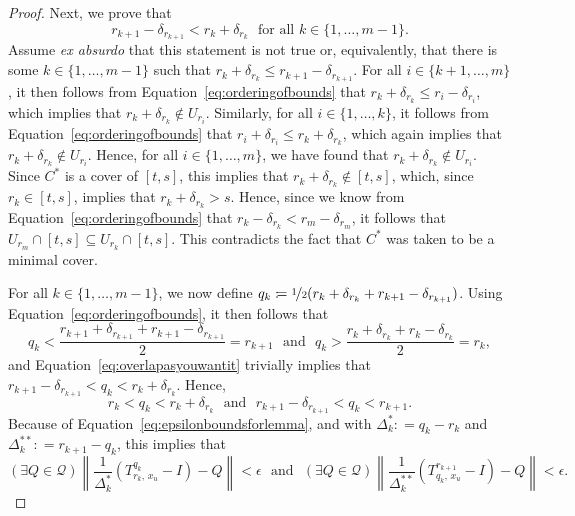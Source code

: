 \documentclass[10pt]{paper}
\theoremstyle{definition}
\newcommand{\rateset}{\mathcal{Q}}
\newcommand{\norm}[1]{\left\lVert #1 \right\rVert}
\newcommand{\coloneqq}{:\!=}
\begin{document}
\begin{proof}
Next, we prove that
\begin{equation}\label{eq:overlapasyouwantit}
r_{k+1}-\delta_{r_{k+1}}<r_k+\delta_{r_k}
\text{~~for all $k\in\{1,\dots,m-1\}$.}
\end{equation}
Assume \emph{ex absurdo} that this statement is not true or, equivalently, that there is some $k\in\{1,\dots,m-1\}$ such that $r_k+\delta_{r_k}\leq r_{k+1}-\delta_{r_{k+1}}$. For all $i\in\{k+1,\dots, m\}$, it then follows from Equation~\eqref{eq:orderingofbounds} that $r_k+\delta_{r_k}\leq r_i-\delta_{r_i}$, which implies that $r_k+\delta_{r_k}\notin U_{r_i}$. Similarly, for all $i\in\{1,\dots,k\}$, it follows from Equation~\eqref{eq:orderingofbounds} that $r_i+\delta_{r_i}\leq r_k+\delta_{r_k}$, which again implies that $r_k+\delta_{r_k}\notin U_{r_i}$. 
Hence, for all $i\in\{1,\dots,m\}$, we have found that $r_k+\delta_{r_k}\notin U_{r_i}$. 
Since $C^*$ is a cover of $[t,s]$, this implies that $r_k+\delta_{r_k}\notin[t,s]$, which, since $r_k\in[t,s]$, implies that $r_k+\delta_{r_k}>s$. Hence, since we know from Equation~\eqref{eq:orderingofbounds} that $r_k-\delta_{r_k}<r_m-\delta_{r_m}$, it follows that $U_{r_m}\cap[t,s]\subseteq U_{r_k}\cap[t,s]$. This contradicts the fact that $C^*$ was taken to be a minimal cover.

For all $k\in\{1,\dots,m-1\}$, we now define $q_k\coloneqq\nicefrac{1}{2}(r_k+\delta_{r_k}+r_{k+1}-\delta_{r_{k+1}})$.
Using Equation~\eqref{eq:orderingofbounds}, it then follows that
\begin{equation*}
q_k<\frac{r_{k+1}+\delta_{r_{k+1}}+r_{k+1}-\delta_{r_{k+1}}}{2}=r_{k+1}
\text{~~and~~}
q_k>\frac{r_{k}+\delta_{r_{k}}+r_{k}-\delta_{r_{k}}}{2}=r_{k},
\end{equation*}
and Equation~\eqref{eq:overlapasyouwantit} trivially implies that $r_{k+1}-\delta_{r_{k+1}}<q_k<r_k+\delta_{r_k}$. Hence,
\begin{equation*}
r_k<q_k<r_k+\delta_{r_k}
\text{~~and~~}
r_{k+1}-\delta_{r_{k+1}}<q_k<r_{k+1}.
\end{equation*}
Because of Equation~\eqref{eq:epsilonboundsforlemma}, and with $\Delta^*_k\coloneqq q_k-r_k$ and $\Delta^{**}_k\coloneqq r_{k+1}-q_k$, this implies that
\begin{equation}\label{eq:epsilonboundsforqk}
(\exists Q\in\rateset)
\norm{\frac{1}{\Delta^*_k}
(T^{q_k}_{r_k,\,x_u}-I)-Q}<\epsilon
\text{~~and~~}
(\exists Q\in\rateset)
\norm{\frac{1}{\Delta^{**}_k}
(T^{r_{k+1}}_{q_k,\,x_u}-I)-Q}<\epsilon.
\end{equation}


\end{proof}
\end{document}
